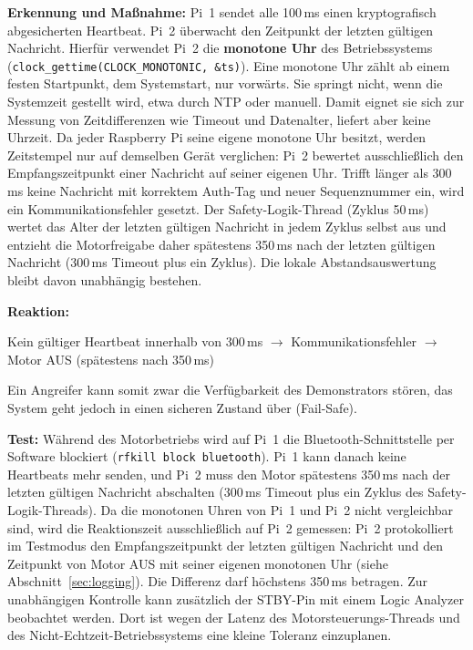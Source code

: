 \textbf{Erkennung und Maßnahme:} Pi~1 sendet alle 100\,ms einen kryptografisch
abgesicherten Heartbeat. Pi~2 überwacht den Zeitpunkt der letzten gültigen Nachricht.
Hierfür verwendet Pi~2 die \textbf{monotone Uhr} des Betriebssystems
(\texttt{clock\_gettime(CLOCK\_MONOTONIC, \&ts)}). Eine monotone Uhr zählt ab einem
festen Startpunkt, dem Systemstart, nur vorwärts. Sie springt nicht, wenn die
Systemzeit gestellt wird, etwa durch NTP oder manuell. Damit eignet sie sich zur
Messung von Zeitdifferenzen wie Timeout und Datenalter, liefert aber keine
Uhrzeit. Da jeder Raspberry Pi seine eigene monotone Uhr besitzt, werden
Zeitstempel nur auf demselben Gerät verglichen: Pi~2 bewertet ausschließlich den
Empfangszeitpunkt einer Nachricht auf seiner eigenen Uhr. Trifft länger als 300\,ms keine
Nachricht mit korrektem Auth-Tag und neuer Sequenznummer ein, wird ein Kommunikationsfehler
gesetzt. Der Safety-Logik-Thread (Zyklus 50\,ms) wertet das Alter der letzten
gültigen Nachricht in jedem Zyklus selbst aus und entzieht die Motorfreigabe daher
spätestens 350\,ms nach der letzten gültigen Nachricht (300\,ms Timeout plus ein
Zyklus). Die lokale Abstandsauswertung bleibt davon unabhängig bestehen.

\textbf{Reaktion:}
\begin{center}
    Kein gültiger Heartbeat innerhalb von 300\,ms $\rightarrow$ Kommunikationsfehler $\rightarrow$ Motor AUS (spätestens nach 350\,ms)
\end{center}

Ein Angreifer kann somit zwar die Verfügbarkeit des Demonstrators stören, das
System geht jedoch in einen sicheren Zustand über (Fail-Safe).

\textbf{Test:} Während des Motorbetriebs wird auf Pi~1 die Bluetooth-Schnittstelle
per Software blockiert (\texttt{rfkill block bluetooth}). Pi~1 kann danach keine
Heartbeats mehr senden, und Pi~2 muss den Motor spätestens 350\,ms nach der
letzten gültigen Nachricht abschalten (300\,ms Timeout plus ein Zyklus des
Safety-Logik-Threads). Da die monotonen Uhren von Pi~1 und Pi~2 nicht
vergleichbar sind, wird die Reaktionszeit ausschließlich auf Pi~2 gemessen:
Pi~2 protokolliert im Testmodus den Empfangszeitpunkt der letzten gültigen
Nachricht und den Zeitpunkt von Motor AUS mit seiner eigenen monotonen Uhr
(siehe Abschnitt~\ref{sec:logging}). Die Differenz darf höchstens 350\,ms
betragen. Zur unabhängigen Kontrolle kann zusätzlich der STBY-Pin mit einem
Logic Analyzer beobachtet werden. Dort ist wegen der Latenz des
Motorsteuerungs-Threads und des Nicht-Echtzeit-Betriebssystems eine kleine
Toleranz einzuplanen.

